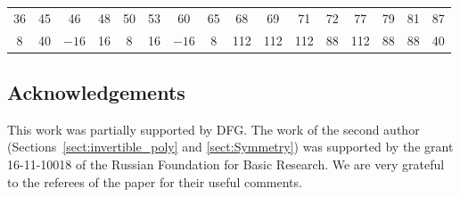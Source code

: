 \documentclass[pdftex]{sigma}
\numberwithin{equation}{section}
\begin{document}
\begin{center}
\begin{tabular}{cccccccccccccccc}
\hline
 36 & 45 & 46 & 48 & 50 & 53 & 60 & 65 & 68 & 69 & 71 & 72 & 77 & 79 & 81 & 87\\
 8 & 40 & $-16$ & 16 & 8 & 16 & $-16$ & 8 & 112 & 112 & 112 & 88 & 112 & 88 & 88 & 40\\
\hline
\end{tabular}
\end{center}

\subsection*{Acknowledgements}
This work was partially supported by DFG. The work of the second author (Sections~\ref{sect:invertible_poly} and \ref{sect:Symmetry}) was supported by the grant 16-11-10018 of the Russian Foundation for Basic Research. We are very grateful to the referees of the paper for their useful comments.
\end{document}
